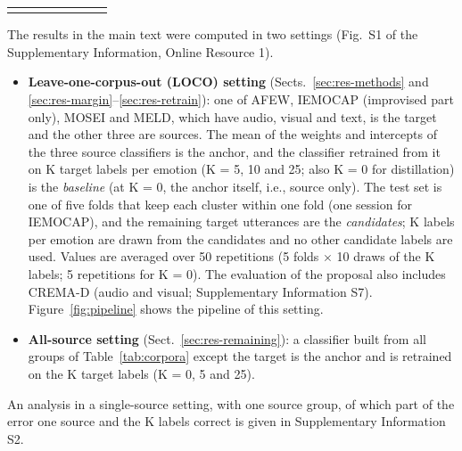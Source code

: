 \begin{table}[t]
\begin{tabular}{@{}p{1.55cm}p{1.7cm}p{1.95cm}p{0.75cm}r p{1.5cm}p{1.7cm}p{1.35cm}@{}}
\botrule
\end{tabular}
\end{table}

The results in the main text were computed in two settings (Fig.~S1 of the Supplementary Information, Online Resource 1).
\begin{itemize}
\item \textbf{Leave-one-corpus-out (LOCO) setting} (Sects.~\ref{sec:res-methods} and \ref{sec:res-margin}--\ref{sec:res-retrain}): one of AFEW, IEMOCAP (improvised part only), MOSEI and MELD, which have audio, visual and text, is the target and the other three are sources. The mean of the weights and intercepts of the three source classifiers is the anchor, and the classifier retrained from it on K target labels per emotion (K = 5, 10 and 25; also K = 0 for distillation) is the \emph{baseline} (at K = 0, the anchor itself, i.e., source only). The test set is one of five folds that keep each cluster within one fold (one session for IEMOCAP), and the remaining target utterances are the \emph{candidates}; K labels per emotion are drawn from the candidates and no other candidate labels are used. Values are averaged over 50 repetitions (5 folds $\times$ 10 draws of the K labels; 5 repetitions for K = 0). The evaluation of the proposal also includes CREMA-D (audio and visual; Supplementary Information S7). Figure~\ref{fig:pipeline} shows the pipeline of this setting.
\item \textbf{All-source setting} (Sect.~\ref{sec:res-remaining}): a classifier built from all groups of Table~\ref{tab:corpora} except the target is the anchor and is retrained on the K target labels (K = 0, 5 and 25).
\end{itemize}
An analysis in a single-source setting, with one source group, of which part of the error one source and the K labels correct is given in Supplementary Information S2.


